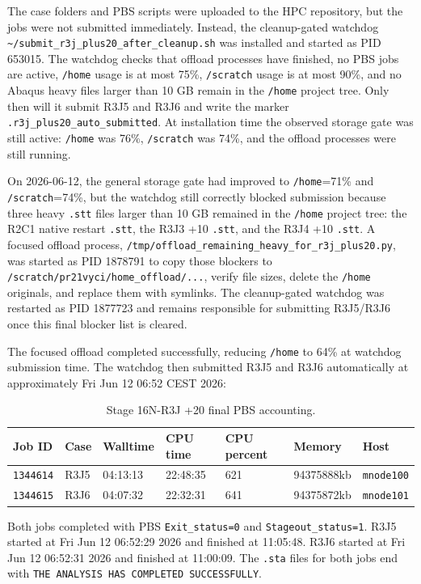 \documentclass[11pt,a4paper]{article}
\newcommand{\code}[1]{\texttt{#1}}
\begin{document}
The case folders and PBS scripts were uploaded to the HPC repository, but the jobs were not submitted immediately. Instead, the cleanup-gated watchdog \code{\textasciitilde/submit\_r3j\_plus20\_after\_cleanup.sh} was installed and started as PID 653015. The watchdog checks that offload processes have finished, no PBS jobs are active, \code{/home} usage is at most 75\%, \code{/scratch} usage is at most 90\%, and no Abaqus heavy files larger than 10 GB remain in the \code{/home} project tree. Only then will it submit R3J5 and R3J6 and write the marker \code{.r3j\_plus20\_auto\_submitted}. At installation time the observed storage gate was still active: \code{/home} was 76\%, \code{/scratch} was 74\%, and the offload processes were still running.

On 2026-06-12, the general storage gate had improved to \code{/home}=71\% and \code{/scratch}=74\%, but the watchdog still correctly blocked submission because three heavy \code{.stt} files larger than 10 GB remained in the \code{/home} project tree: the R2C1 native restart \code{.stt}, the R3J3 +10 \code{.stt}, and the R3J4 +10 \code{.stt}. A focused offload process, \code{/tmp/offload\_remaining\_heavy\_for\_r3j\_plus20.py}, was started as PID 1878791 to copy those blockers to \code{/scratch/pr21vyci/home\_offload/...}, verify file sizes, delete the \code{/home} originals, and replace them with symlinks. The cleanup-gated watchdog was restarted as PID 1877723 and remains responsible for submitting R3J5/R3J6 once this final blocker list is cleared.

The focused offload completed successfully, reducing \code{/home} to 64\% at watchdog submission time. The watchdog then submitted R3J5 and R3J6 automatically at approximately Fri Jun 12 06:52 CEST 2026:

\begin{table}[H]
\centering
\caption{Stage 16N-R3J +20 final PBS accounting.}
\begin{tabular}{lllllll}
\toprule
Job ID & Case & Walltime & CPU time & CPU percent & Memory & Host \\
\midrule
\code{1344614} & R3J5 & 04:13:13 & 22:48:35 & 621 & 94375888kb & \code{mnode100} \\
\code{1344615} & R3J6 & 04:07:32 & 22:32:31 & 641 & 94375872kb & \code{mnode101} \\
\bottomrule
\end{tabular}
\end{table}

Both jobs completed with PBS \code{Exit\_status=0} and \code{Stageout\_status=1}. R3J5 started at Fri Jun 12 06:52:29 2026 and finished at 11:05:48. R3J6 started at Fri Jun 12 06:52:31 2026 and finished at 11:00:09. The \code{.sta} files for both jobs end with \code{THE ANALYSIS HAS COMPLETED SUCCESSFULLY}.
\end{document}
